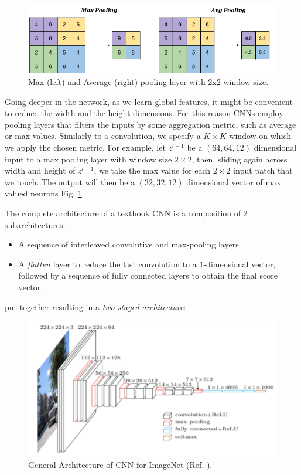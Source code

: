 \documentclass[LaM,binding=0.6cm]{./packages/sapthesis/sapthesis}
\begin{document}
            \begin{figure}[b!]
                \centering
                \includegraphics[scale=0.30]{pooling}
                \caption{Max (left) and Average (right) pooling layer with 2x2 window size.}
                \label{fig:pooling}
            \end{figure}
            Going deeper in the network, as we learn global features, it might be convenient to reduce the width and the height dimensions. For this reason CNNs employ pooling layers
            that filters the inputs by some aggregation metric, such as average or max values. Similarly to a convolution, we specify a 
            $ K \times K $ window on which we apply the chosen metric. For example, let $z^{l-1}$ be a $(64,64,12)$ dimensional
            input to a max pooling layer with window size $2\times2$, then, sliding again across width and height of $z^{l-1}$, we take the max value for each
            $ 2 \times 2 $ input patch that we touch. The output will then be a $ (32, 32, 12) $ dimensional vector of max valued neurons Fig. \ref{fig:pooling}. 


            The complete architecture of a textbook CNN is a composition of 2 subarchitectures:
            \begin{itemize}
                \item A sequence of interleaved convolutive and max-pooling layers
                \item A \textit{flatten} layer to reduce the last convolution to a 1-dimensional vector, followed by a sequence of fully connected layers to obtain the final score vector.
            \end{itemize} 
            put together resulting in a  \textit{two-staged architecture}: 
            \begin{figure}[h!!]
                \centering
                \includegraphics[scale=0.11]{cnnarch}
                \caption{General Architecture of CNN for ImageNet (Ref. ).}
                \label{fig:cnnarch}
            \end{figure}
            
\end{document}
